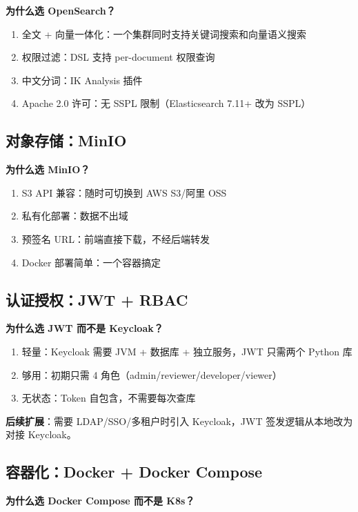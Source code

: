 \documentclass[11pt,a4paper]{article}
\begin{document}
\textbf{为什么选 OpenSearch？}

\begin{enumerate}[nosep]
  \item 全文 + 向量一体化：一个集群同时支持关键词搜索和向量语义搜索
  \item 权限过滤：DSL 支持 per-document 权限查询
  \item 中文分词：IK Analysis 插件
  \item Apache 2.0 许可：无 SSPL 限制（Elasticsearch 7.11+ 改为 SSPL）
\end{enumerate}

\subsection{对象存储：MinIO}

\textbf{为什么选 MinIO？}

\begin{enumerate}[nosep]
  \item S3 API 兼容：随时可切换到 AWS S3/阿里 OSS
  \item 私有化部署：数据不出域
  \item 预签名 URL：前端直接下载，不经后端转发
  \item Docker 部署简单：一个容器搞定
\end{enumerate}

\subsection{认证授权：JWT + RBAC}

\textbf{为什么选 JWT 而不是 Keycloak？}

\begin{enumerate}[nosep]
  \item 轻量：Keycloak 需要 JVM + 数据库 + 独立服务，JWT 只需两个 Python 库
  \item 够用：初期只需 4 角色（admin/reviewer/developer/viewer）
  \item 无状态：Token 自包含，不需要每次查库
\end{enumerate}

\textbf{后续扩展}：需要 LDAP/SSO/多租户时引入 Keycloak，JWT 签发逻辑从本地改为对接 Keycloak。

\subsection{容器化：Docker + Docker Compose}

\textbf{为什么选 Docker Compose 而不是 K8s？}
\end{document}
